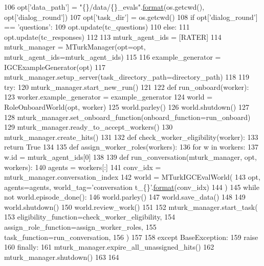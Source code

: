 \begin{DoxyCode}
106         opt[\textcolor{stringliteral}{'data\_path'}] = \textcolor{stringliteral}{"\{\}/data/\{\}\_evals"}.\hyperlink{namespaceparlai_1_1chat__service_1_1services_1_1messenger_1_1shared__utils_a32e2e2022b824fbaf80c747160b52a76}{format}(os.getcwd(), opt[\textcolor{stringliteral}{'dialog\_round'}])
107     opt[\textcolor{stringliteral}{'task\_dir'}] = os.getcwd()
108     \textcolor{keywordflow}{if} opt[\textcolor{stringliteral}{'dialog\_round'}] == \textcolor{stringliteral}{'questions'}:
109         opt.update(tc\_questions)
110     \textcolor{keywordflow}{else}:
111         opt.update(tc\_responses)
112 
113     mturk\_agent\_ids = [RATER]
114     mturk\_manager = MTurkManager(opt=opt, mturk\_agent\_ids=mturk\_agent\_ids)
115 
116     example\_generator = IGCExampleGenerator(opt)
117     mturk\_manager.setup\_server(task\_directory\_path=directory\_path)
118 
119     \textcolor{keywordflow}{try}:
120         mturk\_manager.start\_new\_run()
121 
122         \textcolor{keyword}{def }run\_onboard(worker):
123             worker.example\_generator = example\_generator
124             world = RoleOnboardWorld(opt, worker)
125             world.parley()
126             world.shutdown()
127 
128         mturk\_manager.set\_onboard\_function(onboard\_function=run\_onboard)
129         mturk\_manager.ready\_to\_accept\_workers()
130         mturk\_manager.create\_hits()
131 
132         \textcolor{keyword}{def }check\_worker\_eligibility(worker):
133             \textcolor{keywordflow}{return} \textcolor{keyword}{True}
134 
135         \textcolor{keyword}{def }assign\_worker\_roles(workers):
136             \textcolor{keywordflow}{for} w \textcolor{keywordflow}{in} workers:
137                 w.id = mturk\_agent\_ids[0]
138 
139         \textcolor{keyword}{def }run\_conversation(mturk\_manager, opt, workers):
140             agents = workers[:]
141             conv\_idx = mturk\_manager.conversation\_index
142             world = MTurkIGCEvalWorld(
143                 opt, agents=agents, world\_tag=\textcolor{stringliteral}{'conversation t\_\{\}'}.\hyperlink{namespaceparlai_1_1chat__service_1_1services_1_1messenger_1_1shared__utils_a32e2e2022b824fbaf80c747160b52a76}{format}(conv\_idx)
144             )
145             \textcolor{keywordflow}{while} \textcolor{keywordflow}{not} world.episode\_done():
146                 world.parley()
147             world.save\_data()
148 
149             world.shutdown()
150             world.review\_work()
151 
152         mturk\_manager.start\_task(
153             eligibility\_function=check\_worker\_eligibility,
154             assign\_role\_function=assign\_worker\_roles,
155             task\_function=run\_conversation,
156         )
157 
158     \textcolor{keywordflow}{except} BaseException:
159         \textcolor{keywordflow}{raise}
160     \textcolor{keywordflow}{finally}:
161         mturk\_manager.expire\_all\_unassigned\_hits()
162         mturk\_manager.shutdown()
163 
164 
\end{DoxyCode}


